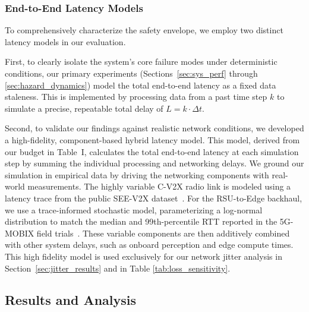 








\subsubsection{End-to-End Latency Models}
\label{sec:e2e_lat_model}
To comprehensively characterize the safety envelope, we employ two distinct latency models in our evaluation.

First, to clearly isolate the system's core failure modes under deterministic conditions, our primary experiments (Sections~\ref{sec:sys_perf} through \ref{sec:hazard_dynamics}) model the total end-to-end latency as a fixed data staleness. This is implemented by processing data from a past time step $k$ to simulate a precise, repeatable total delay of $L = k \cdot \Delta t$.

Second, to validate our findings against realistic network conditions, we developed a high-fidelity, component-based hybrid latency model. This model, derived from our budget in Table~I, calculates the total end-to-end latency at each simulation step by summing the individual processing and networking delays. We ground our simulation in empirical data by driving the networking components with real-world measurements. The highly variable C-V2X radio link is modeled using a latency trace from the public SEE-V2X dataset~\cite{seev2x}. For the RSU-to-Edge backhaul, we use a trace-informed stochastic model, parameterizing a log-normal distribution to match the median and 99th-percentile RTT reported in the 5G-MOBIX field trials~\cite{5gMobix2023}. These variable components are then additively combined with other system delays, such as onboard perception and edge compute times. This high fidelity model is used exclusively for our network jitter analysis in Section~\ref{sec:jitter_results} and in Table \ref{tab:loss_sensitivity}.



\subsection{Results and Analysis}

